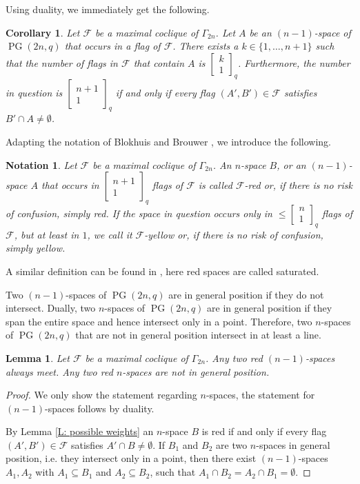 \documentclass[11pt, oneside, a4paper]{article}
\newtheorem{lemma}[thm]{Lemma}
\newtheorem{cor}[thm]{Corollary}
\newtheorem{notation}[thm]{Notation}
\newcommand{\EKR}{\mathcal{F}}
\newcommand{\Gauss}[2]{{\begin{bmatrix} #1 \\ #2 \end{bmatrix}_q}}
\DeclareMathOperator{\PG}{PG}
\begin{document}
Using duality, we immediately get the following.

\begin{cor}
    \label{C: possible weights}
Let $\EKR$ be a maximal coclique of $\Gamma_{2n}$.
    Let $A$ be an $(n-1)$-space of $\PG(2n,q)$ that occurs in a flag of $\EKR$. There exists a $k\in\{ 1,\ldots,n+1\}$ such that the number of flags in $\EKR$ that contain $A$ is $\Gauss{k}{1}$. Furthermore, the number in question is $\Gauss{n+1}{1}$ if and only if every flag $(A',B')\in \EKR$ satisfies $B'\cap A\neq \emptyset$.
\end{cor}

Adapting the notation of Blokhuis and Brouwer \cite{cocliquesonlineplane4d}, we introduce the following.

\begin{notation}
Let $\EKR$ be a maximal coclique of $\Gamma_{2n}$.
    An $n$-space $B$, or an $(n-1)$-space $A$ that occurs in $\Gauss{n+1}{1}$ flags of $\EKR$ is called $\EKR$-red or, if there is no risk of confusion, simply red. If the space in question occurs only in $\leq \Gauss{n}{1}$ flags of $\EKR$, but at least in $1$, we call it $\EKR$-yellow or, if there is no risk of confusion, simply yellow.
\end{notation}

A similar definition can be found in \cite{werner_metsch}, here red spaces are called saturated.

Two $(n-1)$-spaces of $\PG(2n,q)$ are in general position if they do not intersect. Dually, two $n$-spaces of $\PG(2n,q)$ are in general position if they span the entire space and hence intersect only in a point. Therefore, two $n$-spaces of $\PG(2n,q)$ that are not in general position intersect in at least a line.

\begin{lemma} 
Let $\EKR$ be a maximal coclique of $\Gamma_{2n}$.
Any two red $(n-1)$-spaces always meet.
Any two red $n$-spaces are not in general position.
\end{lemma}

\begin{proof}
We only show the statement regarding $n$-spaces, the statement for $(n-1)$-spaces follows by duality.

By Lemma \ref{L: possible weights} an $n$-space $B$ is red if and only if every flag $(A',B')\in \EKR$ satisfies $A'\cap B\neq \emptyset$. If $B_1$ and $B_2$ are two $n$-spaces in general position, i.e. they intersect only in a point, then there exist $(n-1)$-spaces $A_1, A_2$ with $A_1\subseteq B_1$ and $A_2\subseteq B_2$, such that  $A_1\cap B_2=A_2\cap B_1=\emptyset$. 
\end{proof}
\end{document}

